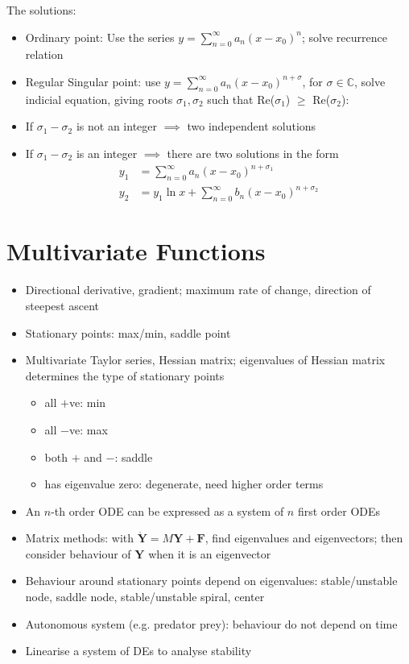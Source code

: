 \begin{itemize}
          The solutions:
          \begin{itemize}
              \item Ordinary point: Use the series $y=\sum_{n=0}^{\infty} a_n (x-x_0)^n$; solve recurrence relation
              \item Regular Singular point: use $y=\sum_{n=0}^{\infty} a_n (x-x_0)^{n+\sigma}$, for $\sigma \in \mathbb{C} $, solve indicial equation, giving roots $\sigma_1, \sigma_2$ such that Re($\sigma_1$) $\geq$ Re($\sigma_2$):
              \item If $\sigma_1 - \sigma_2$ is not an integer $\implies $ two independent solutions
              \item If $\sigma_1 - \sigma_2$ is an integer $\implies$ there are two solutions in the form
                    \begin{align*}
                        y_1 & = \sum_{n=0}^{\infty}a_n (x-x_0)^{n+\sigma_1}             \\
                        y_2 & = y_1 \ln x + \sum_{n=0}^{\infty}b_n (x-x_0)^{n+\sigma_2}\end{align*}
          \end{itemize}
\end{itemize}

\section{Multivariate Functions}
\begin{itemize}
    \item Directional derivative, gradient; maximum rate of change, direction of steepest ascent
    \item Stationary points: max/min, saddle point
    \item Multivariate Taylor series, Hessian matrix; eigenvalues of Hessian matrix determines the type of stationary points
          \begin{itemize}
              \item all $+$ve: min
              \item all $-$ve: max
              \item both $+$ and $-$: saddle
              \item has eigenvalue zero: degenerate, need higher order terms
          \end{itemize}
    \item An $n$-th order ODE can be expressed as a system of $n$ first order ODEs
    \item Matrix methods: with $\mathbf{\dot{Y}}=M \mathbf{Y}+\mathbf{F}$, find eigenvalues and eigenvectors; then consider behaviour of $\mathbf{Y}$ when it is an eigenvector
    \item Behaviour around stationary points depend on eigenvalues: stable/unstable node, saddle node, stable/unstable spiral, center
    \item Autonomous system (e.g. predator prey): behaviour do not depend on time
    \item Linearise a system of DEs to analyse stability
\end{itemize}

